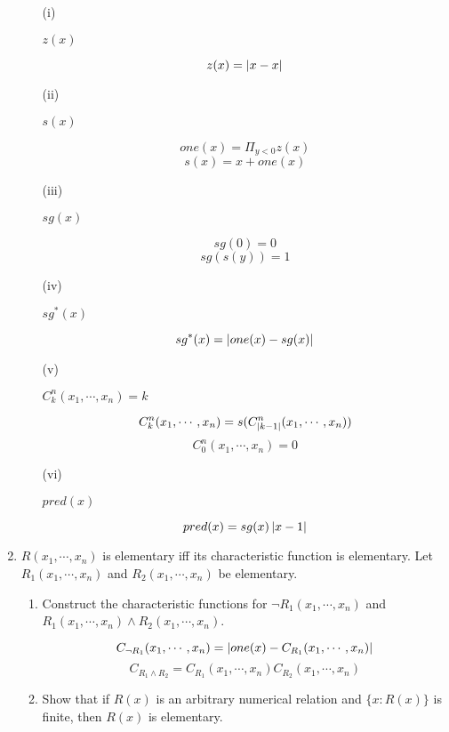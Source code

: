 \begin{enumerate}
    \begin{enumerate}
      \item [(i)]
        \begin{question} $z(x)$ \end{question}
        $$z(x) = \left\vert x-x \right\vert$$
      \item [(ii)]
        \begin{question} $s(x)$ \end{question}
        $$one(x) = \Pi_{y < 0} z(x)$$
        $$s(x) = x + one(x)$$
      \item [(iii)]
        \begin{question} $sg(x)$ \end{question}
        $$sg(0) = 0$$
        $$sg(s(y)) = 1$$
      \item [(iv)]
        \begin{question} $sg^*(x)$ \end{question}
        $$sg^*(x) = \left\vert one(x) - sg(x) \right\vert$$
      \item [(v)]
        \begin{question} $C^n_k(x_1,\cdots,x_n)=k$ \end{question}
        $$C^n_k(x_1,\cdots,x_n) = s(C^n_{\left\vert k-1 \right\vert}(x_1,\cdots,x_n))$$
        $$C^n_0(x_1,\cdots,x_n) = 0$$
      \item [(vi)]
        \begin{question} $pred(x)$ \end{question}
        $$pred(x) = sg(x)\left\vert x - 1 \right\vert$$
        
    \end{enumerate}


  \item
    \begin{question}
      $R(x_1, \cdots, x_n)$ is elementary iff its characteristic function is elementary. Let $R_1(x_1, \cdots, x_n)$ and $R_2(x_1, \cdots, x_n)$ be elementary.
    \end{question}

    \begin{enumerate}
      \item
        \begin{question}
          Construct the characteristic functions for $\neg R_1(x_1,\cdots,x_n)$ and $R_1(x_1,\cdots,x_n) \land R_2(x_1,\cdots,x_n)$.
        \end{question}

        $$C_{\neg R_1}(x_1, \cdots, x_n) = \left\vert one(x) - C_{R_1}(x_1, \cdots, x_n) \right\vert$$
        $$C_{R_1 \land R_2} = C_{R_1}(x_1, \cdots, x_n) C_{R_2}(x_1, \cdots, x_n)$$
      \item
        \begin{question}
          Show that if $R(x)$ is an arbitrary numerical relation and $\{ x : R(x) \}$ is finite, then $R(x)$ is elementary.
        \end{question}


\end{enumerate}
\end{enumerate}
